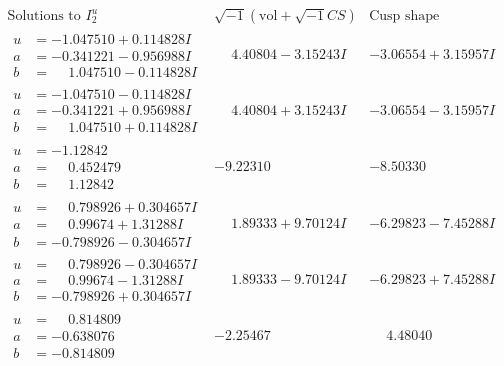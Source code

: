 \documentclass[1p]{elsarticle_modified}
\theoremstyle{definition}
\newcommand{\I}{\sqrt{-1}}
\begin{document}
$$\begin{array}{c|c|c}  
\text{Solutions to }I^u_{2}& \I (\text{vol} + \sqrt{-1}CS) & \text{Cusp shape}\\
 \hline 
\begin{aligned}
u &= -1.047510 + 0.114828 I \\
a &= -0.341221 - 0.956988 I \\
b &= \phantom{-}1.047510 - 0.114828 I\end{aligned}
 & \phantom{-}4.40804 - 3.15243 I & -3.06554 + 3.15957 I \\ \hline\begin{aligned}
u &= -1.047510 - 0.114828 I \\
a &= -0.341221 + 0.956988 I \\
b &= \phantom{-}1.047510 + 0.114828 I\end{aligned}
 & \phantom{-}4.40804 + 3.15243 I & -3.06554 - 3.15957 I \\ \hline\begin{aligned}
u &= -1.12842\phantom{ +0.000000I} \\
a &= \phantom{-}0.452479\phantom{ +0.000000I} \\
b &= \phantom{-}1.12842\phantom{ +0.000000I}\end{aligned}
 & -9.22310\phantom{ +0.000000I} & -8.50330\phantom{ +0.000000I} \\ \hline\begin{aligned}
u &= \phantom{-}0.798926 + 0.304657 I \\
a &= \phantom{-}0.99674 + 1.31288 I \\
b &= -0.798926 - 0.304657 I\end{aligned}
 & \phantom{-}1.89333 + 9.70124 I & -6.29823 - 7.45288 I \\ \hline\begin{aligned}
u &= \phantom{-}0.798926 - 0.304657 I \\
a &= \phantom{-}0.99674 - 1.31288 I \\
b &= -0.798926 + 0.304657 I\end{aligned}
 & \phantom{-}1.89333 - 9.70124 I & -6.29823 + 7.45288 I \\ \hline\begin{aligned}
u &= \phantom{-}0.814809\phantom{ +0.000000I} \\
a &= -0.638076\phantom{ +0.000000I} \\
b &= -0.814809\phantom{ +0.000000I}\end{aligned}
 & -2.25467\phantom{ +0.000000I} & \phantom{-}4.48040\phantom{ +0.000000I} \\ \hline\begin{aligned}

\end{aligned}
\end{array}$$
\end{document}
